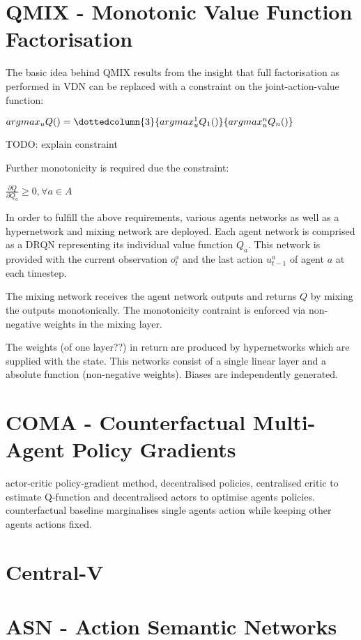 \section{QMIX - Monotonic Value Function Factorisation}
The basic idea behind QMIX results from the insight that full factorisation as performed in VDN can be replaced with a constraint on the joint-action-value function:

\begin{center}
	$ argmax_u Q() = \dottedcolumn{3}{argmax_u^1 Q_1()}{argmax_u^n Q_n()}$
\end{center}
TODO: explain constraint

Further monotonicity is required due the constraint:

\begin{center}
	$ \frac{\partial Q}{\partial Q_a} \geq 0, \forall a \in A$
\end{center}

In order to fulfill the above requirements, various agents networks as well as a hypernetwork and mixing network are deployed.
Each agent network is comprised as a DRQN representing its individual value function $Q_a$. This network is provided with the current observation $o_t^a$ and the last action $u_{t-1}^a$ of agent $a$ at each timestep.

The mixing network receives the agent network outputs and returns $Q$ by mixing the outputs monotonically. The monotonicity contraint is enforced via non-negative weights in the mixing layer.

The weights (of one layer??) in return are produced by hypernetworks which are supplied with the state. This networks consist of a single linear layer and a absolute function (non-negative weights). Biases are independently generated.

%
%
%
\section{COMA - Counterfactual Multi-Agent Policy Gradients}

actor-critic policy-gradient method, decentralised policies, centralised critic to estimate Q-function and decentralised actors to optimise agents policies. counterfactual baseline marginalises single agents action while keeping other agents actions fixed.
%
%
%
\section{Central-V}
%
%
%
\section{ASN - Action Semantic Networks}
%
%
%
